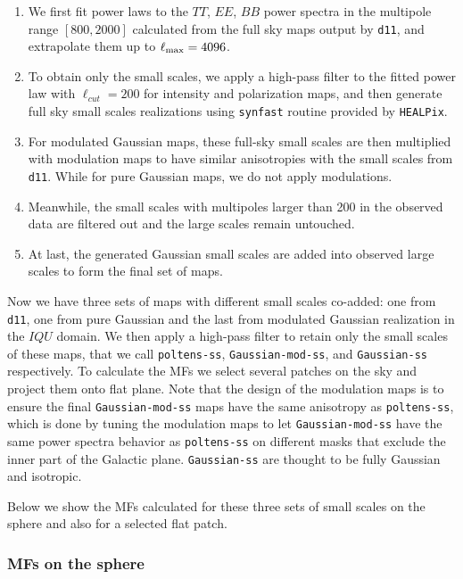 \documentclass[twocolumn]{aastex631}
\newcommand{\deleven}{{\tt d11}}
\begin{document}
\begin{enumerate}

\item We first fit power laws to the $TT$, $EE$, $BB$ power spectra in the multipole range $[800, 2000]$ calculated from the full sky maps output by \deleven{}, and extrapolate them up to $\ell_{\rm max}=4096$. 
\item To obtain only the small scales, we apply a high-pass filter to the fitted power law with $\ell_{cut} = 200$ for intensity and polarization maps, and then generate full sky small scales realizations using \texttt{synfast} routine provided by \texttt{HEALPix}. 
\item For modulated Gaussian maps, these full-sky small scales are then multiplied with modulation maps to have similar anisotropies with the small scales from \deleven{}. While for pure Gaussian maps, we do not apply modulations. 
\item Meanwhile, the small scales with multipoles larger than 200 in the observed data are filtered out and the large scales remain untouched.
\item At last, the generated Gaussian small scales are added into observed large scales to form the final set of maps. 
\end{enumerate}

Now we have three sets of maps with different small scales co-added: one from \deleven{}, one from pure Gaussian and the last from modulated Gaussian realization in the $IQU$ domain. We then apply a high-pass filter to retain only the small scales of these maps, that we call \texttt{poltens-ss}, \texttt{Gaussian-mod-ss}, and \texttt{Gaussian-ss} respectively. To calculate the MFs we select several patches on the sky and project them onto flat plane. Note that the design of the modulation maps is to ensure the final \texttt{Gaussian-mod-ss} maps have the same anisotropy as \texttt{poltens-ss}, which is done by tuning the modulation maps to let \texttt{Gaussian-mod-ss} have the same power spectra behavior as \texttt{poltens-ss} on different masks that exclude the inner part of the Galactic plane. \texttt{Gaussian-ss} are thought to be fully Gaussian and isotropic. 

Below we show the MFs calculated for these three sets of small scales on the sphere and also for a selected flat patch.

\subsubsection{MFs on the sphere}
\end{document}
